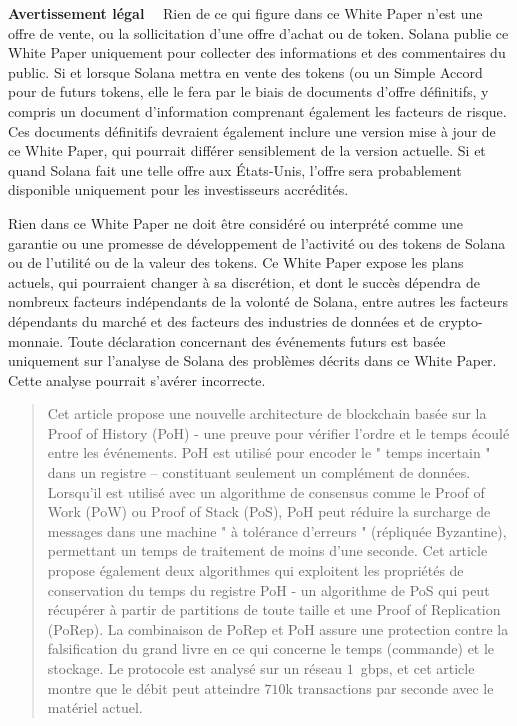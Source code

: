 \documentclass[12pt]{article}
\begin{document}
\maketitle

\textbf{\footnotesize Avertissement légal}\scriptsize
~~Rien de ce qui figure dans ce White Paper n'est une offre de vente, ou la sollicitation d'une offre d'achat ou de token. Solana publie ce White Paper uniquement pour collecter des informations et des commentaires du public. Si et lorsque Solana mettra en vente des tokens (ou un Simple Accord pour de futurs tokens, elle le fera par le biais de documents d'offre définitifs, y compris un document d'information comprenant également les facteurs de risque. Ces documents définitifs devraient également inclure une version mise à jour de ce White Paper, qui pourrait différer sensiblement de la version actuelle. Si et quand Solana fait une telle offre aux États-Unis, l'offre sera probablement disponible uniquement pour les investisseurs accrédités.

Rien dans ce White Paper ne doit être considéré ou interprété comme une garantie ou une promesse de développement de l'activité ou des tokens de Solana ou de l'utilité ou de la valeur des tokens. Ce White Paper expose les plans actuels, qui pourraient changer à sa discrétion, et dont le succès dépendra de nombreux facteurs indépendants de la volonté de Solana, entre autres les facteurs dépendants du marché et des facteurs des industries de données et de crypto-monnaie. Toute déclaration concernant des événements futurs est basée uniquement sur l'analyse de Solana des problèmes décrits dans ce White Paper. Cette analyse pourrait s’avérer incorrecte.

\begin{abstract}
Cet article propose une nouvelle architecture de blockchain basée sur la Proof of History (PoH) - une preuve pour vérifier l'ordre et le temps écoulé entre les événements. PoH est utilisé pour encoder le " temps incertain " dans un registre – constituant seulement un complément de données. Lorsqu'il est utilisé avec un algorithme de consensus comme le Proof of Work (PoW) ou Proof of Stack (PoS), PoH peut réduire la surcharge de messages dans une machine " à tolérance d’erreurs " (répliquée Byzantine), permettant un temps de traitement de moins d’une seconde. Cet article propose également deux algorithmes qui exploitent les propriétés de conservation du temps du registre PoH - un algorithme de PoS qui peut récupérer à partir de partitions de toute taille et une Proof of Replication (PoRep). La combinaison de PoRep et PoH assure une protection contre la falsification du grand livre en ce qui concerne le temps (commande) et le stockage. Le protocole est analysé sur un réseau $1$~gbps, et cet article montre que le débit peut atteindre $710$k transactions par seconde avec le matériel actuel.
\end{abstract}
\end{document}
